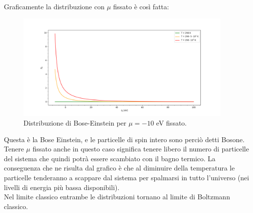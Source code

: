 Graficamente la distribuzione con $\mu$ fissato è così fatta:
\begin{figure}[H]
	\centering
	\includegraphics[width=0.95\textwidth]{figures/bose_einstein.png}
	\caption{\scriptsize Distribuzione di Bose-Einstein per $\mu = -10$ eV fissato.}
	\label{fig:figures-bose_einstein-png}
\end{figure}
\noindent
Questa è la Bose Einstein, e le particelle di spin intero sono perciò detti Bosone.\\
Tenere $\mu $ fissato anche in questo caso significa tenere libero il numero di particelle del sistema che quindi potrà essere scambiato con il bagno termico. La conseguenza che ne risulta dal grafico è che al diminuire della temperatura le particelle tenderanno a scappare dal sistema per spalmarsi in tutto l'universo (nei livelli di energia più bassa disponibili).\\
Nel limite classico entrambe le distribuzioni tornano al limite di Boltzmann classico.

